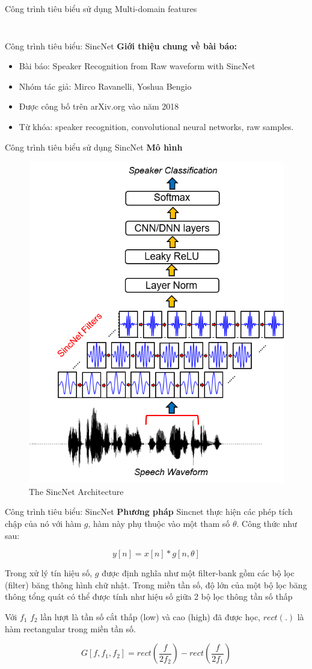 \documentclass[notheorems, aspectratio=54]{beamer}
\begin{document}
\begin{frame}{Công trình tiêu biểu sử dụng Multi-domain features}
\begin{columns}
\begin{column}{0.5\textwidth}
\begin{figure}[H]
			\end{figure}
		\end{column}
	\end{columns}
\end{frame}
\begin{frame}{Công trình tiêu biểu: SincNet}
	\textbf{Giới thiệu chung về bài báo:}
	\begin{itemize}
		\item Bài báo: Speaker Recognition from Raw waveform with SincNet
		\item Nhóm tác giả: Mirco Ravanelli, Yoshua Bengio
		\item Được công bố trên arXiv.org vào năm 2018
		\item Từ khóa: speaker recognition, convolutional neural networks, raw samples.
	\end{itemize}
\end{frame}
\begin{frame}{Công trình tiêu biểu sử dụng SincNet}
	\textbf{Mô hình}
	\begin{figure}[H]
		\includegraphics[width=0.4\linewidth]{images/SincNet.png}
		\caption{The SincNet Architecture}
		\label{fig:writing-thesis}
	\end{figure}
\end{frame}
\begin{frame}{Công trình tiêu biểu: SincNet}
	\textbf{Phương pháp} Sincnet thực hiện các phép tích chập của nó với hàm $g$, hàm này phụ thuộc vào một tham số $\theta$. Công thức như sau:
	
	$$y[n] = x[n] * g[n, \theta]$$
	
	Trong xử lý tín hiệu số, $g$ được định nghĩa như một filter-bank gồm các bộ lọc (filter) băng thông hình chữ nhật. Trong miền tần số, độ lớn của một bộ lọc băng thông tổng quát có thể được tính như hiệu số giữa 2 bộ lọc thông tần số thấp
	
	Với $f_1$ $f_2$ lần lượt là tần số cắt thấp (low) và cao (high) đã được học, $rect(.)$ là hàm rectangular trong miền tần số.
	
	$$G[f, f_1, f_2] = rect\left(\frac{f}{2f_2}\right) -  rect\left(\frac{f}{2f_1}\right)$$
\end{frame}
\end{document}
